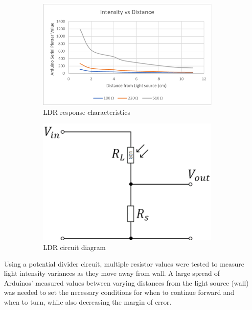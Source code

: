\begin{figure}
    \centering
    \begin{subfigure}[b]{.45\linewidth}
        \includegraphics[width=\linewidth]{images/ldr-graph.png}
        \caption{LDR response characteristics}
    \end{subfigure}
    \begin{subfigure}[b]{0.45\linewidth}
        \includegraphics[width=\linewidth]{images/ldr-circuit.png}
        \caption{LDR circuit diagram}
    \end{subfigure}
    \caption{}
\end{figure}

Using a potential divider circuit, multiple resistor values were tested to measure light intensity variances as they move away from wall. A large spread of Arduinos’ measured values between varying distances from the light source (wall) was needed to set the necessary conditions for when to continue forward and when to turn, while also decreasing the margin of error.

